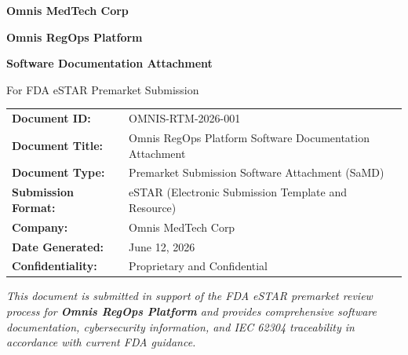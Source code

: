 \documentclass[11pt]{article}
\begin{document}
\begin{titlepage}
    \centering
    \vspace*{2.5cm}

    {\Large \textbf{Omnis MedTech Corp} \par}
    \vspace{1.2cm}

    {\huge \textbf{Omnis RegOps Platform} \par}
    \vspace{0.6cm}

    {\Large \textbf{Software Documentation Attachment} \par}
    \vspace{0.5cm}

    {\large For FDA eSTAR Premarket Submission \par}
    \vspace{1.8cm}

    \begin{tabular}{>{\bfseries}p{4.5cm} p{9.0cm}}
        \toprule
        Document ID:        & OMNIS-RTM-2026-001 \\[4pt]
        Document Title:     & Omnis RegOps Platform Software Documentation Attachment \\[4pt]
        Document Type:      & Premarket Submission Software Attachment (SaMD) \\[4pt]
        Submission Format:  & eSTAR (Electronic Submission Template and Resource) \\[4pt]
        Company:            & Omnis MedTech Corp \\[4pt]
        Date Generated:     & June 12, 2026 \\[4pt]
        Confidentiality:    & Proprietary and Confidential \\
        \bottomrule
    \end{tabular}

    \vfill

    \begin{minipage}{0.85\textwidth}
        \centering
        \small
        \textit{This document is submitted in support of the FDA eSTAR premarket
        review process for \textbf{Omnis RegOps Platform} and provides comprehensive
        software documentation, cybersecurity information, and IEC 62304
        traceability in accordance with current FDA guidance.}
    \end{minipage}

    \vspace*{1.5cm}
\end{titlepage}
\end{document}
